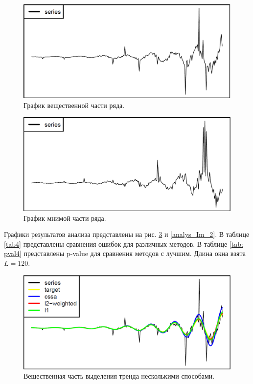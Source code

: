 \documentclass[specialist,
               substylefile = spbu.rtx,
               subf,href,colorlinks=true, 12pt]{disser}
\begin{document}
\begin{figure}[H]
	\begin{center}
		\includegraphics[width=0.67\linewidth]{img/ser_2_Re.png}
		\caption{График вещественной части ряда.}
		\label{ser_Re_2}
	\end{center}
\end{figure}

\begin{figure}[H]
	\begin{center}
		\includegraphics[width=0.67\linewidth]{img/ser_2_Im.png}
		\caption{График мнимой части ряда.}
		\label{ser_Im_2}
	\end{center}
\end{figure}

Графики результатов анализа представлены на рис. \ref{analys_Re_2} и \ref{analys_Im_2}. В таблице \ref{tab4} представлены сравнения ошибок для различных методов. В таблице \ref{tab: pval4} представлены p-value для сравнения методов с лучшим. Длина окна взята $L = 120$.

\begin{figure}[H]
	\begin{center}
		\includegraphics[width=0.67\linewidth]{img/analys_2_Re.png}
		\caption{Вещественная часть выделения тренда несколькими способами.}
		\label{analys_Re_2}
	\end{center}
\end{figure}
\end{document}

